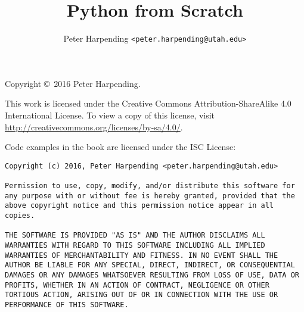 \documentclass[12pt,letterpaper,oneside]{memoir}
\theoremstyle{definition}
\theoremstyle{plain}
\begin{document}
\title{Python from Scratch}
\author{Peter Harpending \texttt{<peter.harpending@utah.edu>}}
\maketitle

\noindent \hrulefill

Copyright \copyright\ 2016 Peter Harpending.

This work is licensed under the Creative Commons
Attribution-ShareAlike 4.0 International License. To view a copy of
this license, visit
\url{http://creativecommons.org/licenses/by-sa/4.0/}.

Code examples in the book are licensed under the ISC License:

\begin{lstlisting}
Copyright (c) 2016, Peter Harpending <peter.harpending@utah.edu>

Permission to use, copy, modify, and/or distribute this software for
any purpose with or without fee is hereby granted, provided that the
above copyright notice and this permission notice appear in all
copies.

THE SOFTWARE IS PROVIDED "AS IS" AND THE AUTHOR DISCLAIMS ALL
WARRANTIES WITH REGARD TO THIS SOFTWARE INCLUDING ALL IMPLIED
WARRANTIES OF MERCHANTABILITY AND FITNESS. IN NO EVENT SHALL THE
AUTHOR BE LIABLE FOR ANY SPECIAL, DIRECT, INDIRECT, OR CONSEQUENTIAL
DAMAGES OR ANY DAMAGES WHATSOEVER RESULTING FROM LOSS OF USE, DATA OR
PROFITS, WHETHER IN AN ACTION OF CONTRACT, NEGLIGENCE OR OTHER
TORTIOUS ACTION, ARISING OUT OF OR IN CONNECTION WITH THE USE OR
PERFORMANCE OF THIS SOFTWARE.
\end{lstlisting}

\noindent \hrulefill

\tableofcontents



\printbibliography
\end{document}
